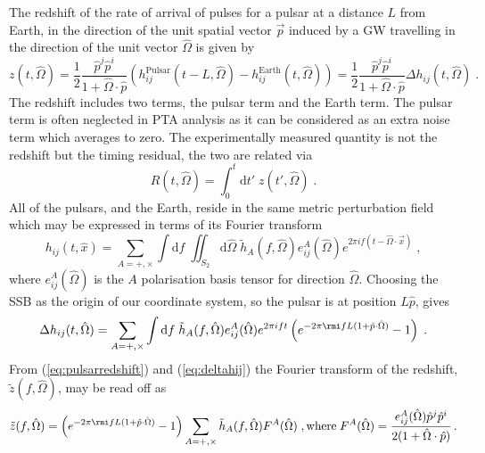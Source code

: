 The redshift of the rate of arrival of pulses for a pulsar at a distance $L$ from Earth, in the direction of the unit spatial vector $\vec{p}$ induced by a GW travelling in the direction of the unit vector $\hat{\Omega}$ is given by \citep{anholm-2009}
\begin{equation}\label{eq:pulsarredshift} z(t,\hat{\Omega})=\frac{1}{2}\frac{\hat{p}^{j}\hat{p}^{i}} {1+\hat{\Omega}\cdot\hat{p}}\left(h_{ij}^{\textrm{Pulsar}}(t-L,\hat{\Omega} )-h_{ij}^{\textrm{Earth}}(t,\hat{\Omega} )\right)=\frac{1}{2}\frac{\hat{p}^{j}\hat{p}^{i}} {1+\hat{\Omega}\cdot\hat{p}}\Delta h_{ij}(t,\hat{\Omega})\; . \end{equation}
The redshift includes two terms, the pulsar term and the Earth term. The pulsar term is often neglected in PTA analysis as it can be considered as an extra noise term which averages to zero. The experimentally measured quantity is not the redshift but the timing residual, the two are related via
\begin{equation}\label{eq:restored}  R(t,\hat{\Omega})=\int_{0}^{t}\textrm{d}t'\;z(t',\hat{\Omega}) \; . \end{equation}
All of the pulsars, and the Earth, reside in the same metric perturbation field which may be expressed in terms of its Fourier transform
\begin{equation} h_{ij}(t,\hat{x})=\sum_{A=+,\times}\int\textrm{d}f\;\iint_{S_{2}}\textrm{d}\hat{\Omega}\; \tilde{h}_{A}(f,\hat{\Omega})e_{ij}^{A}(\hat{\Omega})e^{ 2\pi i f (t-\hat{\Omega}\cdot\vec{x}) } \; ,\end{equation}
where $e^{A}_{ij}(\hat{\Omega})$ is the $A$ polarisation basis tensor for direction $\hat{\Omega}$. Choosing the SSB as the origin of our coordinate system, so the pulsar is at position $L\hat{p}$, gives
\begin{equation}\label{eq:deltahij} \Delta h_{ij}(t,\hat{\Omega})=\sum_{A=+,\times}\int\textrm{d}f\; \tilde{h}_{A}(f,\hat{\Omega})e_{ij}^{A}(\hat{\Omega})e^{ 2\pi i f t }\left(e^{-2\pi\rmi fL (1+\hat{p}\cdot\hat{\Omega})}-1\right) \; . \end{equation}
From (\ref{eq:pulsarredshift}) and (\ref{eq:deltahij}) the Fourier transform of the redshift, $\tilde{z}(f,\hat{\Omega})$, may be read off as
\begin{equation}\label{eq:45} \tilde{z}(f,\hat{\Omega})=\left(e^{-2\pi\rmi fL (1+\hat{p}\cdot\hat{\Omega})}-1\right)\sum_{A=+,\times} \tilde{h}_{A}(f,\hat{\Omega})F^{A}(\hat{\Omega})\;, \textrm{where}\; F^{A}(\hat{\Omega})=\frac{e_{ij}^{A}(\hat{\Omega})\hat{p}^{j}\hat{p}^{i}} {2(1+\hat{\Omega}\cdot\hat{p})} \, .\end{equation}
